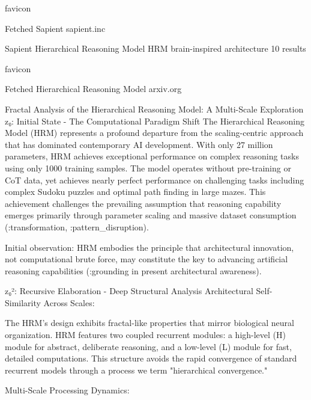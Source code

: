 favicon

Fetched Sapient
sapient.inc


Sapient Hierarchical Reasoning Model HRM brain-inspired architecture
10 results





















favicon

Fetched Hierarchical Reasoning Model
arxiv.org

Fractal Analysis of the Hierarchical Reasoning Model: A Multi-Scale Exploration
z₀: Initial State - The Computational Paradigm Shift
The Hierarchical Reasoning Model (HRM) represents a profound departure from the scaling-centric approach that has dominated contemporary AI development. With only 27 million parameters, HRM achieves exceptional performance on complex reasoning tasks using only 1000 training samples. The model operates without pre-training or CoT data, yet achieves nearly perfect performance on challenging tasks including complex Sudoku puzzles and optimal path finding in large mazes. This achievement challenges the prevailing assumption that reasoning capability emerges primarily through parameter scaling and massive dataset consumption (:transformation, :pattern_disruption).

Initial observation: HRM embodies the principle that architectural innovation, not computational brute force, may constitute the key to advancing artificial reasoning capabilities (:grounding in present architectural awareness).

z₀²: Recursive Elaboration - Deep Structural Analysis
Architectural Self-Similarity Across Scales:

The HRM's design exhibits fractal-like properties that mirror biological neural organization. HRM features two coupled recurrent modules: a high-level (H) module for abstract, deliberate reasoning, and a low-level (L) module for fast, detailed computations. This structure avoids the rapid convergence of standard recurrent models through a process we term "hierarchical convergence."

Multi-Scale Processing Dynamics:

